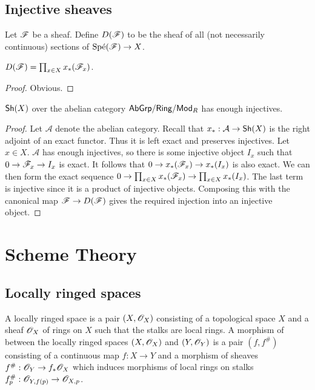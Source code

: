 \documentclass{memoir}
\begin{document}
\section{Injective sheaves}
\begin{definition}
    Let $\mathscr{F}$ be a sheaf.
    Define $D(\mathscr{F})$ to be the sheaf of all (not necessarily continuous) sections of $\text{Sp\'e}(\mathscr{F})\to X$.
\end{definition}
\begin{lemma}
    $D(\mathscr{F}) = \prod_{x\in X}x_*(\mathscr{F}_x)$.
\end{lemma}
\begin{proof}
    Obvious.
\end{proof}
\begin{thm}
    ${\normalfont\mathsf{Sh}}(X)$ over the abelian category ${\normalfont\mathsf{AbGrp}}/{\normalfont\mathsf{Ring}}/{\normalfont\mathsf{Mod}}_R$ has enough injectives.
\end{thm}
\begin{proof}
    Let $\mathcal A$ denote the abelian category.
    Recall that $x_*:\mathcal A\to {\normalfont\mathsf{Sh}}(X)$ is the right adjoint of an exact functor.
    Thus it is left exact and preserves injectives.
    Let $x\in X$. 
    $\mathcal A$ has enough injectives, so there is some injective object $I_x$ such that $0\to \mathscr{F}_x \to I_x$ is exact.
    It follows that $0\to x_*(\mathscr{F}_x)\to x_*(I_x)$ is also exact.
    We can then form the exact sequence $0\to \prod_{x\in X}x_*(\mathscr{F}_x) \to \prod_{x\in X}x_*(I_x)$.
    The last term is injective since it is a product of injective objects.
    Composing this with the canonical map $\mathscr{F}\to D(\mathscr{F})$ gives the required injection into an injective object.
\end{proof}
\chapter{Scheme Theory}
\section{Locally ringed spaces}
A locally ringed space is a pair $(X,\mathscr{O}_X)$ consisting of a topological space $X$ and a sheaf $\mathscr{O}_X$ of rings on $X$ such that the stalks are local rings.
A morphism of between the locally ringed spaces $(X,\mathscr{O}_X)$ and $(Y,\mathscr{O}_Y)$ is a pair $(f,f^\#)$ consisting of a continuous map $f:X\to Y$ and a morphism of sheaves $f^\#:\mathscr{O}_Y\to f_*\mathscr{O}_X$ which induces morphisms of local rings on stalks $f^\#_{p}:\mathscr{O}_{Y,f(p)} \to \mathscr{O}_{X,p}$.
\end{document}
